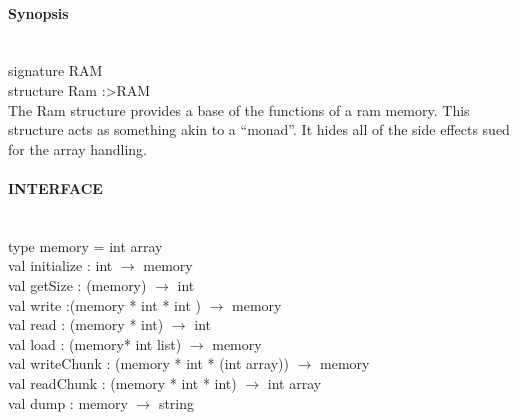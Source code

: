 \documentclass{article}
\begin{document}
\paragraph{Synopsis} \
\\
signature RAM\\
structure Ram :\textgreater RAM\\

The Ram structure provides a base of the functions of a ram memory. This
structure acts as something akin to a ``monad''. It hides all of the side effects
sued for the array handling.

\paragraph{INTERFACE} \
\\
    type memory = int array
	\\val initialize : int $\rightarrow$ memory
 	\\val getSize : (memory) $\rightarrow$ int
    \\val write :(memory * int * int ) $\rightarrow$ memory
	\\val read : (memory * int) $\rightarrow$ int
	\\val load : (memory* int list) $\rightarrow$ memory
	\\val writeChunk : (memory * int * (int array)) $\rightarrow$ memory
	\\val readChunk : (memory * int * int) $\rightarrow$ int array
	\\val dump : memory $\rightarrow$ string
\end{document}
